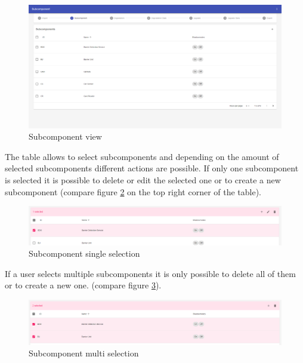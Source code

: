 \begin{figure}[ht]
    \centering
    \includegraphics[width=\textwidth]{img/subcomponents_overview.png}
    \caption{Subcomponent view}
    \label{fig:subcomponent_view}
\end{figure}

The table allows to select subcomponents and depending on the amount of selected subcomponents different actions are possible. If only one subcomponent is selected it is possible to delete or edit the selected one or to create a new subcomponent (compare figure \ref{fig:subcomponent_view_single} on the top right corner of the table).

\begin{figure}[ht]
    \centering
    \includegraphics[width=\textwidth]{img/subcomponents_single_select.png}
    \caption{Subcomponent single selection}
    \label{fig:subcomponent_view_single}
\end{figure}

If a user selects multiple subcomponents it is only possible to delete all of them or to create a new one. (compare figure \ref{fig:subcomponent_view_multi}).

\begin{figure}[ht]
    \centering
    \includegraphics[width=\textwidth]{img/subcomponents_multi_select.png}
    \caption{Subcomponent multi selection}
    \label{fig:subcomponent_view_multi}
\end{figure}


